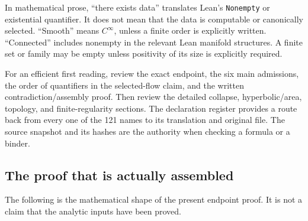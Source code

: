 \documentclass[
  letterpaper,
  11pt]{article}
\begin{document}
In mathematical prose, ``there exists data'' translates Lean's
{\small\texttt{Nonempty}} or existential quantifier. It does not mean
that the data is computable or canonically selected. ``Smooth'' means
\(C^\infty\), unless a finite order is explicitly written. ``Connected''
includes nonempty in the relevant Lean manifold structures. A finite set
or family may be empty unless positivity of its size is explicitly
required.

For an efficient first reading, review the exact endpoint, the six main
admissions, the order of quantifiers in the selected-flow claim, and the
written contradiction/assembly proof. Then review the detailed collapse,
hyperbolic/area, topology, and finite-regularity sections. The
declaration register provides a route back from every one of the 121
names to its translation and original file. The source snapshot and its
hashes are the authority when checking a formula or a binder.

\subsection{The proof that is actually
assembled}\label{actual-proof-map}

The following is the mathematical shape of the present endpoint proof.
It is not a claim that the analytic inputs have been proved.
\end{document}
